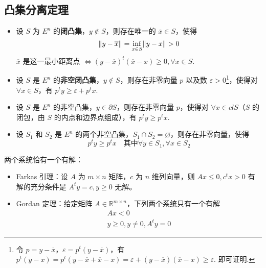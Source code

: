 \subsection{凸集分离定理}
\begin{theorem}[凸集分离定理]
    \text{}
    \begin{itemize}
        \item 设 $S$ 为 $E^n$ 的\textbf{闭凸集}，$y\notin S$，则存在唯一的 $\overline{x} \in S$，使得\[ \norm{y - \overline{x}} = \underset{x \in S}{\inf} \norm{y - x} > 0 \]
        $\overline{x}$ 是这一最小距离点 $\Longleftrightarrow (y - \overline{x})^t(\overline{x} - x) \ge 0, \forall x \in S$.

        \item 设 $S$ 是 $E^n$ 的\textbf{非空闭凸集}，$y\notin S$，则存在非零向量 $p$ 以及数 $\varepsilon > 0$\footnote{令 $p = y - \overline{x}$，$\varepsilon = p^t(y - \overline{x})$，有 $p^t(y - x) = p^t(y - \overline{x} + \overline{x} - x) = \varepsilon + (y - \overline{x})(\overline{x} - x) \ge \varepsilon$. 即可证明.}，使得对 $\forall x \in S$，有 $p^t y \ge \varepsilon + p^t x$.
        
        \item 设 $S$ 是 $E^n$ 的非空凸集，$y\in \partial S$，则存在非零向量 $p$，使得对 $\forall x \in clS$（$S$ 的闭包，由 $S$ 的内点和边界点组成），有 $p^ty \ge p^tx$.
        
        \item 设 $S_1$ 和 $S_2$ 是 $E^n$ 的两个非空凸集，$S_1 \cap S_2 = \varnothing$，则存在非零向量，使得\[p^ty \ge p^t x \quad \text{其中}\forall y \in S_1, \forall x \in S_2\]
    \end{itemize}
\end{theorem}

\begin{theorem}
    两个系统恰有一个有解：
    \begin{itemize}
        \item Farkas 引理：设 $A$ 为 $m\times n$ 矩阵，$c$ 为 $n$ 维列向量，则 $Ax \le 0, c^tx > 0$ 有解的充分条件是 $A^ty = c, y\ge 0$ 无解。
        \item Gordan 定理：给定矩阵 $A \in \mathbb{R}^{m\times n}$，下列两个系统只有一个有解
        \begin{gather*}
            Ax < 0\\
            y \ge 0, y \neq 0, A^ty = 0
        \end{gather*}
    \end{itemize}
\end{theorem}

